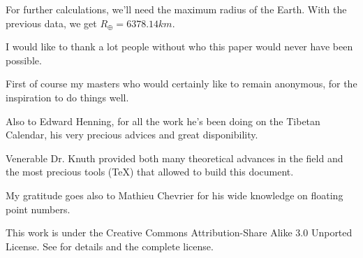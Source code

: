 For further calculations, we'll need the maximum radius of the Earth. With the previous data, we get $R_\oplus=6378.14 km$.

% 


I would like to thank a lot people without who this paper would never have been possible.

First of course my masters who would certainly like to remain anonymous, for the inspiration to do things well.

Also to Edward Henning, for all the work he's been doing on the Tibetan Calendar, his very precious advices and great disponibility.

Venerable Dr. Knuth provided both many theoretical advances in the field and the most precious tools (\TeX ) that allowed to build this document.

My gratitude goes also to Mathieu Chevrier for his wide knowledge on floating point numbers.


This work is under the Creative Commons Attribution-Share Alike 3.0 Unported License. See \cite{CCASA} for details and the complete license.
